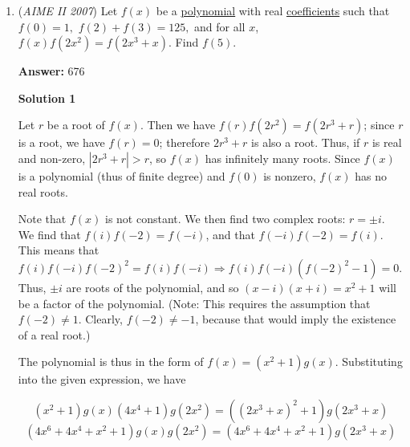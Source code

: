 \begin{enumerate}
 



\textbf{Solution 2}

If we label the bottom row of values $a_1,a_2,\ldots,a_11$ then the sum of the bottom row is $a_1+\ldots+a_11$, the sum of the second row is $a_1+2(a_2+\ldots+a_10)+a_11$ and this pattern continues until the top element is $(a_1+a_11)+2(a_2+a_10)+\ldots+4(a_5+a_7)+5a_6$. Then, the terms with coefficient 0 mod 3 can be anything, and we do casework on the other solutions mod 3. We get 640. ~joeythetoey

 


 \href{https://mathproblemsolvingskills.wordpress.com/}{MathProblemSolvingSkills.com}

 


 


	\item (\textit{AIME II 2007}) Let $f(x)$ be a \href{https://artofproblemsolving.com/wiki/index.php?title=Polynomial}{polynomial} with real \href{https://artofproblemsolving.com/wiki/index.php?title=Coefficient}{coefficients} such that $f(0) = 1,$ $f(2)+f(3)=125,$ and for all $x$, $f(x)f(2x^{2})=f(2x^{3}+x).$ Find $f(5).$

 \textbf{Answer: }676



\textbf{Solution 1}

Let $r$ be a root of $f(x)$. Then we have $f(r)f(2r^2)=f(2r^3+r)$; since $r$ is a root, we have $f(r)=0$; therefore $2r^3+r$ is also a root. Thus, if $r$ is real and non-zero, $|2r^3+r|>r$, so $f(x)$ has infinitely many roots. Since $f(x)$ is a polynomial (thus of finite degree) and $f(0)$ is nonzero, $f(x)$ has no real roots.

 Note that $f(x)$ is not constant. We then find two complex roots: $r = \pm i$. We find that $f(i)f(-2) = f(-i)$, and that $f(-i)f(-2) = f(i)$. This means that $f(i)f(-i)f(-2)^2 = f(i)f(-i) \Longrightarrow f(i)f(-i)(f(-2)^2 - 1) = 0$. Thus, $\pm i$ are roots of the polynomial, and so $(x - i)(x + i) = x^2 + 1$ will be a factor of the polynomial. (Note: This requires the assumption that $f(-2)\neq1$. Clearly, $f(-2)\neq-1$, because that would imply the existence of a real root.)

 The polynomial is thus in the form of $f(x) = (x^2 + 1)g(x)$. Substituting into the given expression, we have 

 
 \[(x^2+1)g(x)(4x^4+1)g(2x^2)=((2x^3+x)^2+1)g(2x^3+x)\]
 \[(4x^6+4x^4+x^2+1)g(x)g(2x^2)=(4x^6+4x^4+x^2+1)g(2x^3+x)\]


\end{enumerate}
